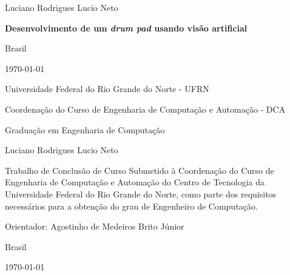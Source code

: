 \documentclass[12pt]{report}
\def\worktitle{Desenvolvimento de um {\it drum pad} usando visão artificial}
\def\workauthor{Luciano Rodrigues Lucio Neto}
\begin{document}
\begin{titlepage}

  \centering
  {\normalsize \workauthor \par}
  \vfill
  {\Large\bfseries \worktitle \par}
  \vfill


  {\normalsize Brasil\par}
  {\normalsize \monthyeardate\today}
\end{titlepage}

\begin{titlepage}
  \centering
  {\small Universidade Federal do Rio Grande do Norte - UFRN \par}
  {\small Coordenação do Curso de Engenharia de Computação e Automação - DCA \par}
  {\small Graduação em Engenharia de Computação \par}
  \vfill

  {\normalsize \workauthor\par}
  \vfill
  \centering
  {\Large\bfseries \par}
  \vfill

  \begin{flushright}  
  \begin{minipage}{15em}  
    Trabalho de Conclusão de Curso Submetido à Coordenação do Curso de Engenharia de Computação e Automação do Centro de Tecnologia da Universidade Federal do Rio Grande do Norte, como parte dos requisitos necessários para a obtenção do grau de Engenheiro de Computação.
  \end{minipage}
  \end{flushright}  
  \vfill
  
  
  \normalsize
  \centering
  {\normalsize Orientador: Agostinho de Medeiros Brito Júnior \par}
  \vfill
  {\normalsize Brasil\par}
  {\normalsize \monthyeardate\today}
\end{titlepage}
\end{document}
